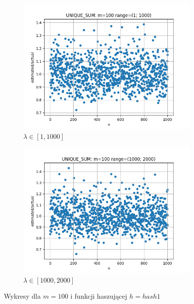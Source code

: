 \documentclass{article}
\begin{document}
\begin{figure}[H]
        \begin{subfigure}{0.6\textwidth}
            \centering
            \includegraphics[width=\linewidth]{sum/zad1_range_1_1000.png}
            \caption{$\lambda \in [1, 1000]$}
        \end{subfigure}
        \begin{subfigure}{0.6\textwidth}
            \centering
            \includegraphics[width=\linewidth]{sum/zad1_range_1000_2000.png}
            \caption{$\lambda \in [1000, 2000]$}
        \end{subfigure}
        \caption{Wykresy dla $m = 100$ i funkcji haszującej $h = hash1$}
    \end{figure}
\end{document}
